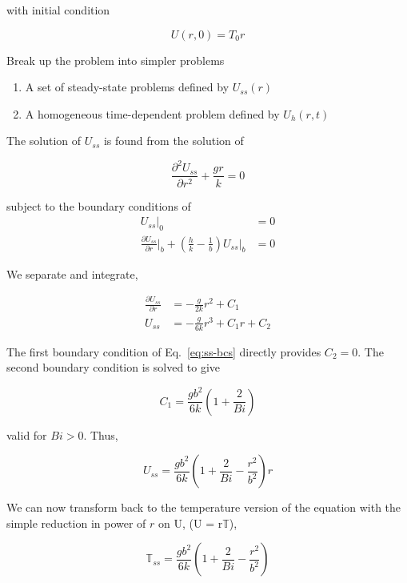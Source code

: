 with initial condition

\begin{equation}
    U(r,0) = T_0r
\end{equation}

Break up the problem into simpler problems

\begin{enumerate}
\item A set of steady-state problems defined by $U_{ss}(r)$
\item A homogeneous time-dependent problem defined by $U_h(r,t)$
\end{enumerate}

The solution of $U_{ss}$ is found from the solution of

\begin{equation}
    \frac{\partial^2 U_{ss}}{\partial r^2} + \frac{gr}{k} = 0
\end{equation}

subject to the boundary conditions of
\begin{align}\label{eq:ss-bcs}
    U_{ss}\big|_0 &= 0\\
    \frac{\partial U_{ss}}{\partial r}\big|_b + \left(\frac{h}{k} - \frac{1}{b}\right)U_{ss}\big|_b &= 0
\end{align}

We separate and integrate, 

\begin{align}
    \frac{\partial U_{ss}}{\partial r} & = -\frac{g}{2k} r^2 + C_1\\
    U_{ss} & = -\frac{g}{6k} r^3 + C_1r + C_2
\end{align}

The first boundary condition of Eq.~\ref{eq:ss-bcs} directly provides $C_2 = 0$. The second boundary condition is solved to give

\begin{equation}
    C_1 = \frac{gb^2}{6k}\left(1 + \frac{2}{Bi}\right)
\end{equation}

valid for $Bi > 0$. Thus,

\begin{equation}
    U_{ss} = \frac{gb^2}{6k}\left(1 + \frac{2}{Bi}-\frac{r^2}{b^2}\right)r
\end{equation}

We can now transform back to the temperature version of the equation with the simple reduction in power of $r$ on U, (U = r$\mathbb{T}$),

\begin{equation}
    \mathbb{T}_{ss} = \frac{gb^2}{6k}\left(1 + \frac{2}{Bi}-\frac{r^2}{b^2}\right) 
\end{equation}

